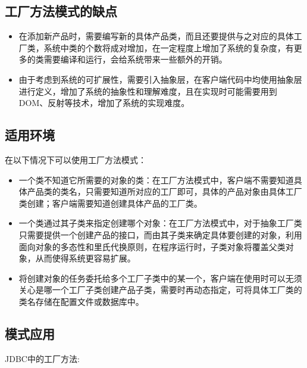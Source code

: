 \documentclass[letterpaper,10pt,english]{sphinxmanual}
\begin{document}
\subsection{工厂方法模式的缺点}
\label{\detokenize{creational_patterns/factory_method:id10}}\begin{itemize}
\item {} 
\sphinxAtStartPar
在添加新产品时，需要编写新的具体产品类，而且还要提供与之对应的具体工厂类，系统中类的个数将成对增加，在一定程度上增加了系统的复杂度，有更多的类需要编译和运行，会给系统带来一些额外的开销。

\item {} 
\sphinxAtStartPar
由于考虑到系统的可扩展性，需要引入抽象层，在客户端代码中均使用抽象层进行定义，增加了系统的抽象性和理解难度，且在实现时可能需要用到DOM、反射等技术，增加了系统的实现难度。

\end{itemize}


\subsection{适用环境}
\label{\detokenize{creational_patterns/factory_method:id11}}
\sphinxAtStartPar
在以下情况下可以使用工厂方法模式：
\begin{itemize}
\item {} 
\sphinxAtStartPar
一个类不知道它所需要的对象的类：在工厂方法模式中，客户端不需要知道具体产品类的类名，只需要知道所对应的工厂即可，具体的产品对象由具体工厂类创建；客户端需要知道创建具体产品的工厂类。

\item {} 
\sphinxAtStartPar
一个类通过其子类来指定创建哪个对象：在工厂方法模式中，对于抽象工厂类只需要提供一个创建产品的接口，而由其子类来确定具体要创建的对象，利用面向对象的多态性和里氏代换原则，在程序运行时，子类对象将覆盖父类对象，从而使得系统更容易扩展。

\item {} 
\sphinxAtStartPar
将创建对象的任务委托给多个工厂子类中的某一个，客户端在使用时可以无须关心是哪一个工厂子类创建产品子类，需要时再动态指定，可将具体工厂类的类名存储在配置文件或数据库中。

\end{itemize}


\subsection{模式应用}
\label{\detokenize{creational_patterns/factory_method:id12}}
\sphinxAtStartPar
JDBC中的工厂方法:
\end{document}
